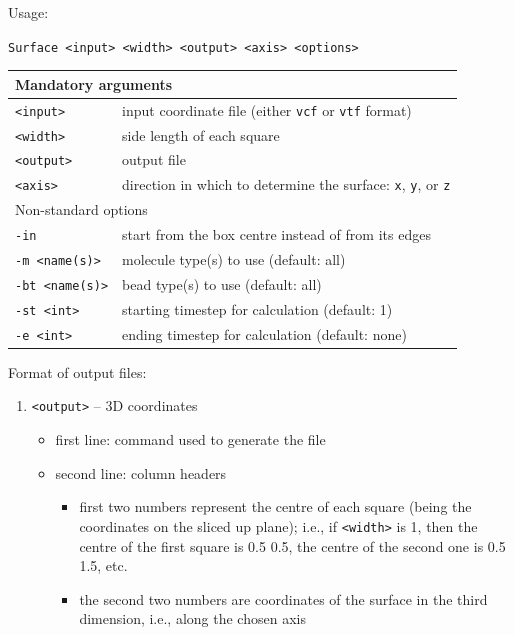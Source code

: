 Usage:

\vspace{1em}
\noindent
\texttt{Surface <input> <width> <output> <axis> <options>}

\noindent
\begin{longtable}{p{}p{}}
  \toprule
  \multicolumn{2}{l}{Mandatory arguments} \\
  \midrule
  \texttt{<input>} & input coordinate file (either \texttt{vcf} or
    \texttt{vtf} format) \\
  \texttt{<width>} & side length of each square \\
  \texttt{<output>} & output file \\
  \texttt{<axis>} & direction in which to determine the surface: \texttt{x},
    \texttt{y}, or \texttt{z} \\
  \toprule
  \multicolumn{2}{l}{Non-standard options} \\
  \midrule
  \texttt{-in} & start from the box centre instead of from its edges \\
  \texttt{-m <name(s)>} & molecule type(s) to use (default: all) \\
  \texttt{-bt <name(s)>} & bead type(s) to use (default: all) \\
  \texttt{-st <int>} & starting timestep for calculation (default: 1) \\
  \texttt{-e <int>} & ending timestep for calculation (default: none) \\
  \bottomrule
\end{longtable}

\noindent
Format of output files:
\begin{enumerate}[nosep,leftmargin=20pt]
  \item \texttt{<output>} -- 3D coordinates
    \begin{itemize}[nosep,leftmargin=5pt]
      \item first line: command used to generate the file
      \item second line: column headers
        \begin{itemize}[nosep,leftmargin=5pt]
          \item first two numbers represent the centre of each square
            (being the coordinates on the sliced up plane); i.e., if \texttt{<width>} is 1,
            then the centre of the first square is 0.5 0.5, the centre of
            the second one is 0.5 1.5, etc.
          \item the second two numbers are coordinates of the surface in
            the third dimension, i.e., along the chosen axis
        \end{itemize}
    \end{itemize}
\end{enumerate}
